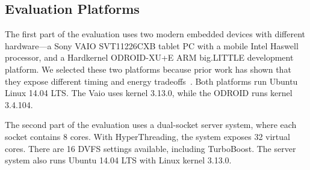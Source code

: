 \subsection{Evaluation Platforms}

The first part of the evaluation uses two modern embedded devices with different hardware---a Sony VAIO SVT11226CXB tablet PC with a mobile Intel Haswell processor, and a Hardkernel ODROID-XU+E ARM big.LITTLE development platform.
We selected these two platforms because prior work has shown that they expose different timing and energy tradeoffs~\cite{Imes2014}.
Both platforms run Ubuntu Linux 14.04 LTS.
The Vaio uses kernel 3.13.0, while the ODROID runs kernel 3.4.104.


The second part of the evaluation uses a dual-socket server system, where each socket contains 8 cores.
With HyperThreading, the system exposes 32 virtual cores.
There are 16 DVFS settings available, including TurboBoost.
The server system also runs Ubuntu 14.04 LTS with Linux kernel 3.13.0.

